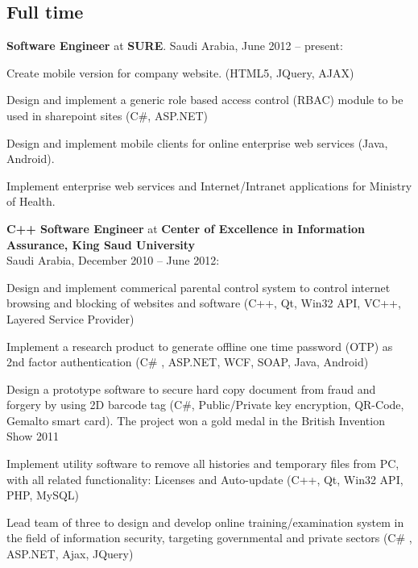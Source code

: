 \documentclass[letterpaper]{article}
\renewenvironment{itemize}{
  \begin{list}{}{
    \setlength{\leftmargin}{1.5em}
  }
}{
  \end{list}
}
\begin{document}
\subsection*{Full time}
\begin{itemize}

\item \textbf{Software Engineer} at \textbf{SURE}.  Saudi Arabia, June 2012 -- present:
\begin{itemize}
\item Create mobile version for company website. (HTML5, JQuery, AJAX)
\item Design and implement a generic role based access control (RBAC) module to be used in sharepoint sites (C\#, ASP.NET)
\item Design and implement mobile clients for online enterprise web services (Java, Android).
\item Implement enterprise web services and Internet/Intranet applications for Ministry of Health.
\end{itemize}

\item \textbf{C++ Software Engineer} at \textbf{Center of Excellence in Information Assurance, King Saud University} \\ Saudi Arabia, December 2010 -- June 2012:
\begin{itemize}
\item Design and implement commerical parental control system to control internet browsing and blocking of websites and software (C++, Qt, Win32 API, VC++, Layered Service Provider)
\item Implement a research product to generate offline one time password (OTP) as 2nd factor authentication (C\# , ASP.NET, WCF, SOAP, Java, Android)
\item Design a prototype software to secure hard copy document from fraud and forgery by using 2D barcode tag (C\#, Public/Private key encryption, QR-Code, Gemalto smart card). The project won a gold medal in the British Invention Show 2011 %
\item Implement utility software to remove all histories and temporary files from PC, with all related functionality: Licenses and Auto-update (C++, Qt, Win32 API, PHP, MySQL)
\item Lead team of three to design and develop online training/examination system in the field of information security, targeting governmental and private sectors (C\# , ASP.NET, Ajax, JQuery)
\end{itemize}

\end{itemize}
\end{document}
